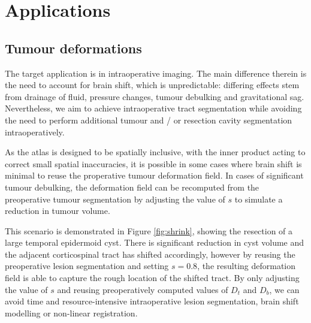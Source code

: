 \section{Applications}




\subsection{Tumour deformations}


The target application is in intraoperative imaging.
The main difference therein is the need to account for brain shift, which is unpredictable: differing effects stem from drainage of fluid, pressure changes, tumour debulking and gravitational sag.
Nevertheless, we aim to achieve intraoperative tract segmentation while avoiding the need to perform additional tumour and / or resection cavity segmentation intraoperatively.

As the atlas is designed to be spatially inclusive, with the inner product acting to correct small spatial inaccuracies, it is possible in some cases where brain shift is minimal to reuse the properative tumour deformation field.
In cases of significant tumour debulking, the deformation field can be recomputed from the preoperative tumour segmentation by adjusting the value of $s$ to simulate a reduction in tumour volume.

This scenario is demonstrated in Figure \ref{fig:shrink}, showing the resection of a large temporal epidermoid cyst. There is significant reduction in cyst volume and the adjacent corticospinal tract has shifted accordingly, however by reusing the preoperative lesion segmentation and setting $s=0.8$, the resulting deformation field is able to capture the rough location of the shifted tract. By only adjusting the value of $s$ and reusing preoperatively computed values of $D_t$ and $D_b$, we can avoid time and resource-intensive intraoperative lesion segmentation, brain shift modelling or non-linear registration.

